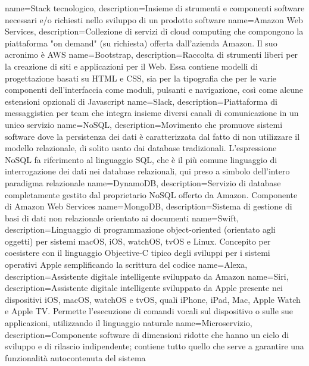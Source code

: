  {
	name=Stack tecnologico,
	description={Insieme di strumenti e componenti software necessari e/o richiesti nello sviluppo
	di un prodotto software}
}
 {
	name=Amazon Web Services,
	description={Collezione di servizi di cloud computing che compongono la piattaforma
	"on demand" (su richiesta) offerta dall'azienda Amazon. Il suo acronimo è AWS}
}
 {
	name=Bootstrap,
	description={Raccolta di strumenti liberi per la creazione di siti e applicazioni per il Web.
	Essa contiene modelli di progettazione basati su HTML e CSS, sia per la tipografia che per le
	varie componenti dell'interfaccia come moduli, pulsanti e navigazione, così come alcune
	estensioni opzionali di Javascript}
}
 {
	name=Slack,
	description={Piattaforma di messaggistica per team che integra insieme diversi canali di
	comunicazione in un unico servizio}
}
 {
	name=NoSQL,
	description={Movimento che promuove sistemi software dove la persistenza dei dati è
	caratterizzata dal fatto di non utilizzare il modello relazionale, di solito usato dai
	database tradizionali. L'espressione NoSQL fa riferimento al linguaggio SQL, che è il più
	comune linguaggio di interrogazione dei dati nei database relazionali, qui preso a simbolo
	dell'intero paradigma relazionale}
}
 {
	name=DynamoDB,
	description={Servizio di database completamente gestito dal proprietario NoSQL offerto da
	Amazon. Componente di Amazon Web Services}
}
 {
	name=MongoDB,
	description={Sistema di gestione di basi di dati non relazionale orientato ai documenti}
}
 {
	name=Swift,
	description={Linguaggio di programmazione object-oriented (orientato agli oggetti) per
	sistemi macOS, iOS, watchOS, tvOS e Linux. Concepito per coesistere con il linguaggio
	Objective-C tipico degli sviluppi per i sistemi operativi Apple semplificando
	la scrittura del codice}
}
 {
	name=Alexa,
	description={Assistente digitale intelligente sviluppato da Amazon}
}
 {
	name=Siri,
	description={Assistente digitale intelligente sviluppato da Apple presente nei dispositivi
	iOS, macOS, watchOS e tvOS, quali iPhone, iPad, Mac, Apple Watch e Apple TV. Permette
	l'esecuzione di comandi vocali sul dispositivo o sulle sue applicazioni, utilizzando il
	linguaggio naturale}
}
 {
	name=Microservizio,
	description={Componente software di dimensioni ridotte che hanno un ciclo di sviluppo e di
	rilascio indipendente; contiene tutto quello che serve a garantire una funzionalità
	autocontenuta del sistema}
}
